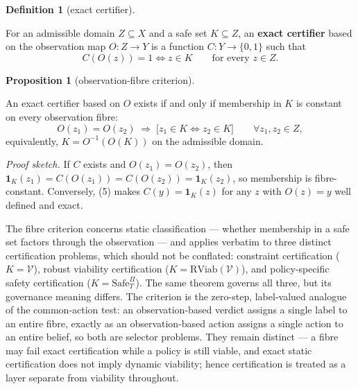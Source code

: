 \documentclass[10pt,twocolumn]{article}
\theoremstyle{definition}
\newtheorem{proposition}{Proposition}
\newtheorem{definition}{Definition}
\begin{document}
\begin{definition}[exact certifier]\label{def:certifier}

For an admissible domain
\(Z \subseteq X\) and a safe set \(K \subseteq Z\), an \textbf{exact
certifier} based on the observation map \(O : Z \to Y\) is a function
\(C : Y \to \{0,1\}\) such that
\[C(O(z)) = 1 \iff z \in K \qquad \text{for every } z \in Z.\]

\end{definition}

\begin{proposition}[observation-fibre criterion]\label{prop:fibre}

An exact certifier
based on \(O\) exists if and only if membership in \(K\) is constant on
every observation fibre:
\[O(z_1) = O(z_2) \;\Longrightarrow\; \big[ z_1 \in K \iff z_2 \in K \big] \qquad \forall z_1, z_2 \in Z, \tag{5}\]
equivalently, \(K = O^{-1}(O(K))\) on the admissible domain.

\end{proposition}

\emph{Proof sketch.} If \(C\) exists and \(O(z_1) = O(z_2)\), then \(\mathbf{1}_K(z_1) = C(O(z_1)) = C(O(z_2)) = \mathbf{1}_K(z_2)\), so membership is fibre-constant. Conversely, (5) makes \(C(y) = \mathbf{1}_K(z)\) for any \(z\) with \(O(z) = y\) well defined and exact.

The fibre criterion concerns static classification --- whether
membership in a safe set factors through the observation --- and applies
verbatim to three distinct certification problems, which should not be
conflated: constraint certification (\(K = \mathcal{V}\)), robust
viability certification (\(K = \mathrm{RViab}(\mathcal{V})\)), and
policy-specific safety certification (\(K = \mathrm{Safe}^{\Pi}_T\)).
The same theorem governs all three, but its governance meaning differs.
The criterion is the zero-step, label-valued analogue of the
common-action test: an observation-based verdict assigns a single label
to an entire fibre, exactly as an observation-based action assigns a
single action to an entire belief, so both are selector problems. They
remain distinct --- a fibre may fail exact certification while a policy
is still viable, and exact static certification does not imply dynamic
viability; hence certification is treated as a layer separate from
viability throughout.
\end{document}
